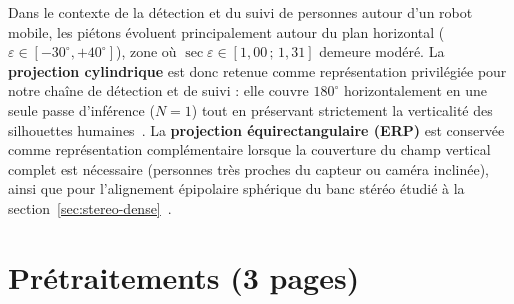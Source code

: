 \documentclass[11pt,a4paper]{article}
\begin{document}
Dans le contexte de la détection et du suivi de personnes autour d'un robot mobile, les piétons évoluent principalement autour du plan horizontal ($\varepsilon \in [-30^\circ, +40^\circ]$), zone où $\sec\varepsilon \in [1{,}00\,;\, 1{,}31]$ demeure modéré. La \textbf{projection cylindrique} est donc retenue comme représentation privilégiée pour notre chaîne de détection et de suivi : elle couvre $180^\circ$ horizontalement en une seule passe d'inférence ($N = 1$) tout en préservant strictement la verticalité des silhouettes humaines~\cite{plaut2021}. La \textbf{projection équirectangulaire (ERP)} est conservée comme représentation complémentaire lorsque la couverture du champ vertical complet est nécessaire (personnes très proches du capteur ou caméra inclinée), ainsi que pour l'alignement épipolaire sphérique du banc stéréo étudié à la section~\ref{sec:stereo-dense}~\cite{abraham2005,su2017spherical}. 


\section{Prétraitements (3 pages)}
\end{document}
